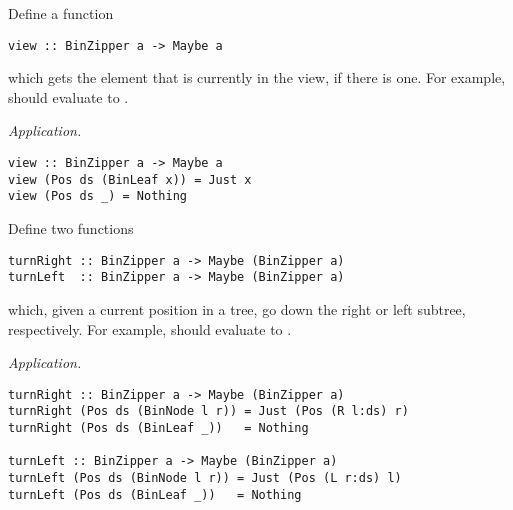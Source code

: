 \begin{parts}
\begin{subparts}
        \subpart[2] Define a function
        \vspace*{0.2cm}
        \begin{verbatim}
view :: BinZipper a -> Maybe a
        \end{verbatim}
        \vspace*{0.2cm} 
        which gets the element that is currently in the view, if there is one. For example,  should evaluate to . \droppoints 
        
        \begin{solution}
            \emph{Application.}
            \begin{small}
                \begin{verbatim}
view :: BinZipper a -> Maybe a 
view (Pos ds (BinLeaf x)) = Just x 
view (Pos ds _) = Nothing
                \end{verbatim}
            \end{small}
        \end{solution}

        \ifprintanswers \else \pagebreak \fi
        
        \subpart[4] Define two functions 
        \vspace*{0.2cm}
        \begin{verbatim}
turnRight :: BinZipper a -> Maybe (BinZipper a)
turnLeft  :: BinZipper a -> Maybe (BinZipper a)
        \end{verbatim}
        \vspace*{0.2cm}
        which, given a current position in a tree, go down the right or left subtree, respectively. For example,  should evaluate to . \droppoints 
        
        \begin{solution}
            \emph{Application.}
            \begin{small}
                \begin{verbatim}
turnRight :: BinZipper a -> Maybe (BinZipper a)
turnRight (Pos ds (BinNode l r)) = Just (Pos (R l:ds) r)
turnRight (Pos ds (BinLeaf _))   = Nothing

turnLeft :: BinZipper a -> Maybe (BinZipper a)
turnLeft (Pos ds (BinNode l r)) = Just (Pos (L r:ds) l)
turnLeft (Pos ds (BinLeaf _))   = Nothing
                \end{verbatim}
            \end{small}
        \end{solution}
        

\end{subparts}
\end{parts}
